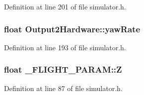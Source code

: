 \-Definition at line 201 of file simulator.\-h.

\hypertarget{group___h_i_t_l_plugin_gab54300de73ca6f11f519068435673210}{
\subsubsection[{yaw\-Rate}]{\setlength{\rightskip}{0pt plus 5cm}float {\bf \-Output2\-Hardware\-::yaw\-Rate}}}\label{group___h_i_t_l_plugin_gab54300de73ca6f11f519068435673210}


\-Definition at line 193 of file simulator.\-h.

\hypertarget{group___h_i_t_l_plugin_gacb21381efc860b328d0be136ef53f98c}{
\subsubsection[{\-Z}]{\setlength{\rightskip}{0pt plus 5cm}float {\bf \-\_\-\-F\-L\-I\-G\-H\-T\-\_\-\-P\-A\-R\-A\-M\-::\-Z}}}\label{group___h_i_t_l_plugin_gacb21381efc860b328d0be136ef53f98c}


\-Definition at line 87 of file simulator.\-h.



